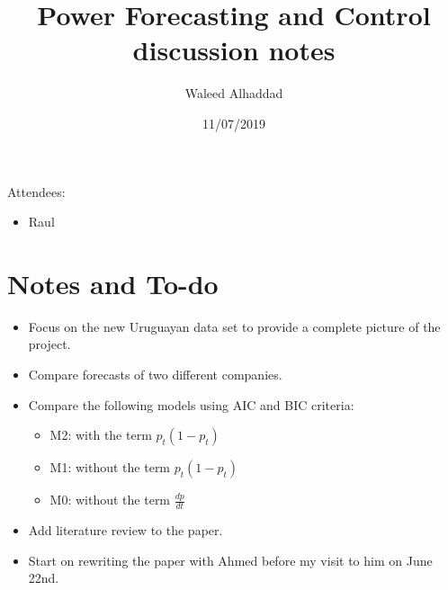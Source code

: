 \documentclass[a4paper, 12pt]{article}
\title{Power Forecasting and Control\\ discussion notes}
\author{Waleed Alhaddad}
\date{11/07/2019}
\begin{document}
\maketitle

Attendees:
\begin{itemize}
	\item Raul
\end{itemize}
\section{Notes and To-do}
\begin{itemize}
\item Focus on the new Uruguayan data set to provide a complete picture of the project.
\item Compare forecasts of two different companies.
\item Compare the following models using AIC and BIC criteria:
	\begin{itemize}
		\item M2: with the term $p_t(1-p_t)$
		\item M1: without the term $p_t(1-p_t)$
		\item M0: without the term $\frac{dp}{dt}$
	\end{itemize}
\item Add literature review to the paper.
\item Start on rewriting the paper with Ahmed before my visit to him on June 22nd.

\end{itemize}
\end{document}
